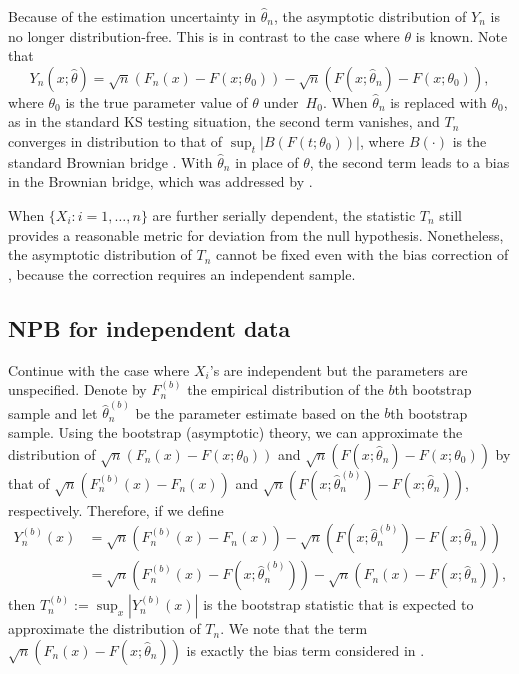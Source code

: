 \documentclass[APA,Times1COL]{WileyNJDv5} %
\begin{document}
Because of the estimation uncertainty in $\hat\theta_n$, the asymptotic
distribution of $Y_n$ is no longer distribution-free. This is in contrast to the
case where $\theta$ is known.  Note that
\begin{equation*}
Y_n(x; \hat\theta) = \sqrt{n}(F_n(x) - F(x; \theta_0)) - 
\sqrt{n}(F(x; \hat\theta_n) - F(x; \theta_0)),
\end{equation*}
where $\theta_0$ is the true parameter value of $\theta$ under~$H_0$.
When $\hat\theta_n$ is replaced with $\theta_0$, as in the standard KS testing
situation, the second term vanishes, and $T_n$ converges in distribution to that
of $\sup_t | B(F(t; \theta_0)) |$, where $B(\cdot)$ is the standard Brownian bridge
\citep{kolmogorov1933sulla}. With $\hat\theta_n$ in place of $\theta$, the
second term leads to a bias in the Brownian bridge, which was addressed by
\citet{babu2004goodness}.


When $\{X_i: i = 1, \ldots, n\}$ are further serially dependent, the statistic
$T_n$ still provides a reasonable metric for deviation from the null
hypothesis. Nonetheless, the asymptotic distribution of $T_n$ cannot be fixed
even with the bias correction of \citet{babu2004goodness}, because the
correction requires an independent sample.

\subsection{NPB for independent data}

Continue with the case where $X_i$'s are independent but the parameters
are unspecified. Denote by
$F^{(b)}_n$ the empirical distribution of the $b$th bootstrap sample and let
$\hat\theta^{(b)}_n$ be the parameter estimate based on the $b$th bootstrap 
sample. 
Using the bootstrap (asymptotic) theory, we can approximate the distribution of
$\sqrt{n}(F_n(x) - F(x; \theta_0))$ and
$\sqrt{n}(F(x; \hat\theta_n) - F(x; \theta_0))$
by that of $\sqrt{n}(F^{(b)}_n(x) - F_n(x))$ and
$\sqrt{n}(F(x; \hat\theta^{(b)}_n) - F(x; \hat\theta_n))$, respectively.
Therefore, if we define
\begin{align*}
Y^{(b)}_n(x) &= \sqrt{n}(F^{(b)}_n(x) - F_n(x)) - 
               \sqrt{n}(F(x; \hat\theta^{(b)}_n) - F(x; \hat\theta_n)) \\
             &= \sqrt{n}(F^{(b)}_n(x) - F(x; \hat\theta^{(b)}_n)) - 
               \sqrt{n}(F_n(x) - F(x; \hat\theta_n)),
\end{align*}
then $T^{(b)}_n := \sup_x|Y^{(b)}_n(x)|$ is the bootstrap statistic that is 
expected to approximate the distribution of $T_n$. 
We note that the term
$\sqrt{n}(F_n(x) - F(x; \hat\theta_n))$ is exactly the bias term considered in 
\citet{babu2004goodness}.
\end{document}
